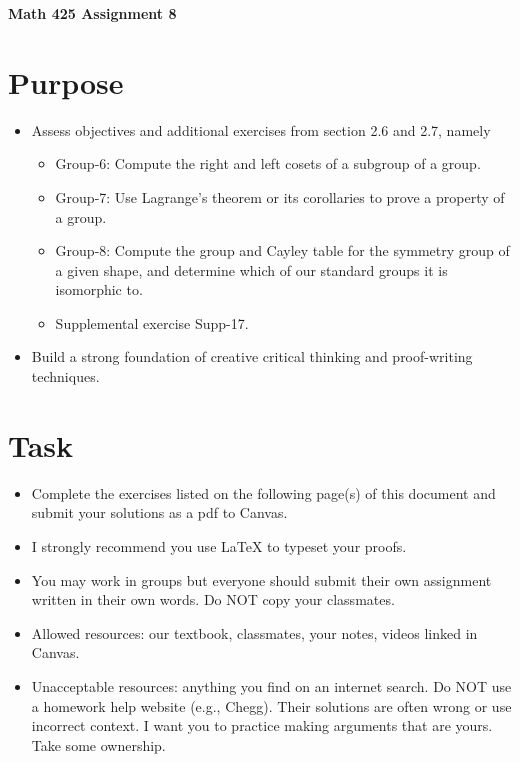 \documentclass[12pt]{article}
\begin{document}
	\begin{center}
		{\Large \bf Math 425 Assignment 8}
	\end{center}
	\section*{Purpose}
		\begin{itemize}
			\item Assess objectives and additional exercises from section 2.6 and 2.7, namely
				\begin{itemize}
					\item Group-6:	Compute the right and left cosets of a subgroup of a group.
					\item Group-7:	Use Lagrange’s theorem or its corollaries to prove a property of a group.
					\item Group-8:	Compute the group and Cayley table for the symmetry group of a given shape, and determine which of our standard groups it is isomorphic to.
					\item Supplemental exercise Supp-17.
				\end{itemize}
			\item Build a strong foundation of creative critical thinking and proof-writing techniques.
		\end{itemize}
	\section*{Task}
		\begin{itemize}
			\item Complete the exercises listed on the following page(s) of this document and submit your solutions as a pdf to Canvas.
			\item I strongly recommend you use LaTeX to typeset your proofs.
			\item You may work in groups but everyone should submit their own assignment written in their own words.  Do NOT copy your classmates.
			\item Allowed resources: our textbook, classmates, your notes, videos linked in Canvas.
			\item Unacceptable resources: anything you find on an internet search. Do NOT use a homework help website (e.g., Chegg). Their solutions are often wrong or use incorrect context.  I want you to practice making arguments that are yours. Take some ownership.
		\end{itemize}
\end{document}

